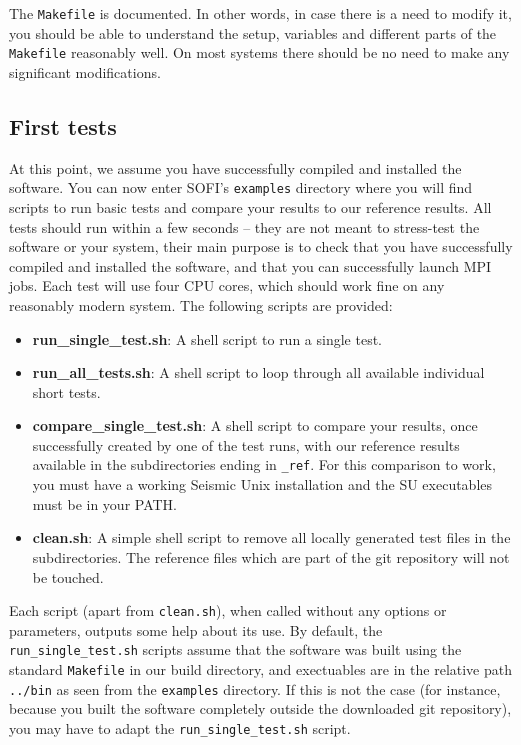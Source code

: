 \documentclass[11pt,english,a4paper]{article}
\begin{document}
The \texttt{Makefile} is documented. In other words, in case there is a need to modify it, you should be able to understand the setup, variables and different parts of the \texttt{Makefile} reasonably well. On most systems there should be no need to make any significant modifications.

\subsection{First tests}
\label{qguide}
At this point, we assume you have successfully compiled and installed the software. You can now enter SOFI's \texttt{examples} directory where you will find scripts to run basic tests and compare your results to our reference results. All tests should run within a few seconds -- they are not meant to stress-test the software or your system, their main purpose is to check that you have successfully compiled and installed the software, and that you can successfully launch MPI jobs. Each test will use four CPU cores, which should work fine on any reasonably modern system. The following scripts are provided:
\begin{itemize}
\item \textbf{run\_single\_test.sh}: A shell script to run a single test.
\item \textbf{run\_all\_tests.sh}: A shell script to loop through all available individual short tests.
\item \textbf{compare\_single\_test.sh}: A shell script to compare your results, once successfully created by one of the test runs, with our reference results available in the subdirectories ending in \texttt{\_ref}. For this comparison to work, you must have a working Seismic Unix installation and the SU executables must be in your PATH.
\item \textbf{clean.sh}: A simple shell script to remove all locally generated test files in the subdirectories. The reference files which are part of the git repository will not be touched.
\end{itemize}
Each script (apart from \texttt{clean.sh}), when called without any options or parameters, outputs some help about its use. By default, the \texttt{run\_single\_test.sh} scripts assume that the software was built using the standard \texttt{Makefile} in our build directory, and exectuables are in the relative path \texttt{../bin} as seen from the \texttt{examples} directory. If this is not the case (for instance, because you built the software completely outside the downloaded git repository), you may have to adapt the \texttt{run\_single\_test.sh} script.
\end{document}
